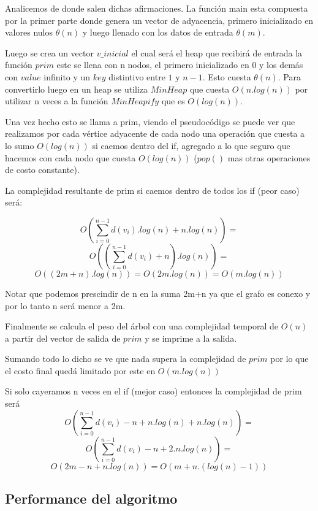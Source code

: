 Analicemos de donde salen dichas afirmaciones. La función main esta compuesta por la primer parte donde  genera un vector de adyacencia, primero inicializado en valores nulos $\theta(n)$ y luego llenado con los datos de entrada $\theta(m)$.

Luego se crea un vector $v\_inicial$ el cual será el heap que recibirá de entrada la función $prim$ este se llena con n nodos, el primero inicializado en $0$ y los demás con $value$ infinito y un $key$ distintivo entre $1$ y $n-1$. Esto cuesta $\theta(n)$. Para convertirlo luego en un heap se utiliza $MinHeap$ que cuesta $O(n.log(n))$ por utilizar n veces a la función $MinHeapify$ que es $O(log(n))$.

Una vez hecho esto se llama a prim, viendo el pseudocódigo se puede ver que realizamos por cada vértice adyacente de cada nodo una operación que cuesta a lo sumo $O(log(n))$ si caemos dentro del if, agregado a lo que seguro que hacemos con cada nodo que cuesta $O(log(n))$ ($pop()$ mas otras operaciones de costo constante).

La complejidad resultante de prim si caemos dentro de todos los if (peor caso) será:

	$$O( \sum_{i=0}^{n-1}d(v_{i}).log(n) + n.log(n) ) = $$
	$$O( (\sum_{i=0}^{n-1}d(v_{i}) + n).log(n) ) = $$
	$$O( (2m + n).log(n) ) = O( 2m.log(n) ) = O(m.log(n))$$ 

Notar que podemos prescindir de n en la suma 2m+n ya que el grafo es conexo y por lo tanto n será menor a 2m.

Finalmente se calcula el peso del árbol con una complejidad temporal de $O(n)$ a partir del vector de salida de $prim$ y se imprime a la salida.

Sumando todo lo dicho se ve que nada supera la complejidad de $prim$ por lo que el costo final quedá limitado por este en $O(m.log(n))$

Si solo cayeramos n veces en el if (mejor caso) entonces la complejidad de prim será
	$$O( \sum_{i=0}^{n-1}d(v_{i}) - n + n.log(n) + n.log(n) ) = $$
	$$O( \sum_{i=0}^{n-1}d(v_{i}) - n + 2.n.log(n) ) = $$
	$$O( 2m - n + n.log(n) ) = O( m + n.(log(n)-1) ) $$

\subsection{Performance del algoritmo}

